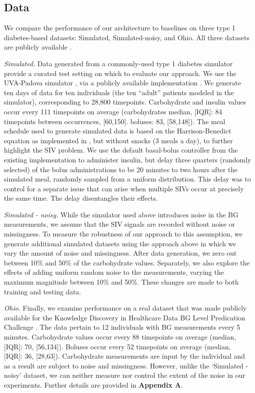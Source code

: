 \documentclass[letterpaper]{article}
\begin{document}
\subsection{Data}


We compare the performance of our architecture to baselines on three type 1 diabetes-based datasets: Simulated, Simulated-noisy, and Ohio. All three datasets are publicly available \cite{uva,simgit,kn:oc}.


\textit{Simulated.} Data generated from a commonly-used type 1 diabetes simulator provide a curated test setting on which to evaluate our approach. We use the UVA-Padova simulator \cite{uva}, via a publicly available implementation \cite{simgit}. We generate ten days of data for ten individuals (the ten ``adult'' patients modeled in the simulator), corresponding to 28,800 timepoints. Carbohydrate and insulin values occur every 111 timepoints on average (carbohydrates median, [IQR]: 84 timepoints between occurrences, [60,150]. boluses: 83, [58,148]). The meal schedule used to generate simulated data is based on the Harrison-Benedict equation \cite{meal} as implemented in \cite{deepblood}, but without snacks (3 meals a day), to further highlight the SIV problem.  We use the default basal-bolus controller from the existing implementation to administer insulin, but delay three quarters (randomly selected) of the bolus administrations to be 20 minutes to two hours after the simulated meal, randomly sampled from a uniform distribution. This delay was to control for a separate issue that can arise when multiple SIVs occur at precisely the same time. The delay disentangles their effects.

\textit{Simulated - noisy.} While the simulator used above introduces noise in the BG measurements, we assume that the SIV signals are recorded without noise or missingness. To measure the robustness of our approach to this assumption, we generate additional simulated datasets using the approach above in which we vary the amount of noise and missingness. After data generation, we zero out between 10\% and 50\% of the carbohydrate values. Separately, we also explore the effects of adding uniform random noise to the measurements, varying the maximum magnitude between 10\% and 50\%. These changes are made to both training and testing data.

\textit{Ohio.} Finally, we examine performance on a real dataset that was made publicly available for the Knowledge Discovery in Healthcare Data BG Level Predication Challenge \cite{kn:oc}.
The data pertain to 12 individuals with BG measurements every 5 minutes. Carbohydrate values occur every 88 timepoints on average (median, [IQR]: 70, [56,134]). Boluses occur every 52 timepoints on average (median, [IQR]: 36, [28,63]). Carbohydrate measurements are input by the individual and as a result are subject to noise and missingness. However, unlike the `Simulated - noisy' dataset, we can neither measure nor control the extent of the noise in our experiments. Further details are provided in \textbf{Appendix A}.
\end{document}

